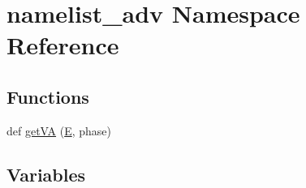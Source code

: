 \hypertarget{namespacenamelist__adv}{}\section{namelist\+\_\+adv Namespace Reference}
\label{namespacenamelist__adv}
\subsection*{Functions}
\begin{DoxyCompactItemize}
\item 
def \hyperlink{namespacenamelist__adv_a68979a64f53a14e42b6964071cab8820}{get\+VA} (\hyperlink{namespacenamelist__adv_ab6b530a81ecfe119f973191c6dcc3d81}{E}, phase)
\end{DoxyCompactItemize}
\subsection*{Variables}

